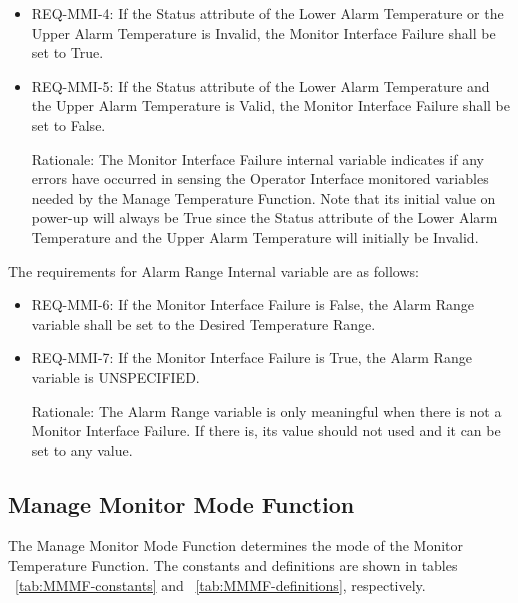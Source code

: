 \begin{itemize}

\item REQ-MMI-4: If the Status attribute of the Lower Alarm Temperature or the Upper
      Alarm Temperature is Invalid, the Monitor Interface Failure shall be set to True.
\item REQ-MMI-5: If the Status attribute of the Lower Alarm Temperature and the Upper
      Alarm Temperature is Valid, the Monitor Interface Failure shall be set to False.

      Rationale: The Monitor Interface Failure internal variable indicates if any errors have
      occurred in sensing the Operator Interface monitored variables needed by the Manage
      Temperature Function. Note that its initial value on power-up will always be True since
      the Status attribute of the Lower Alarm Temperature and the Upper Alarm Temperature
      will initially be Invalid.
\end{itemize}

The requirements for Alarm Range Internal variable are as follows:

\begin{itemize}
\item REQ-MMI-6: If the Monitor Interface Failure is False, the Alarm Range variable shall
      be set to the Desired Temperature Range.
\item REQ-MMI-7: If the Monitor Interface Failure is True, the Alarm Range variable is
      UNSPECIFIED.

      Rationale: The Alarm Range variable is only meaningful when there is not a Monitor
      Interface Failure. If there is, its value should not used and it can be set to any value.
\end{itemize}

\subsection{Manage Monitor Mode Function}
\label{subsec:MMMF}

The Manage Monitor Mode Function determines the mode of the Monitor Temperature
Function. The constants and definitions are shown in tables ~\ref{tab:MMMF-constants} and ~\ref{tab:MMMF-definitions}, respectively.

